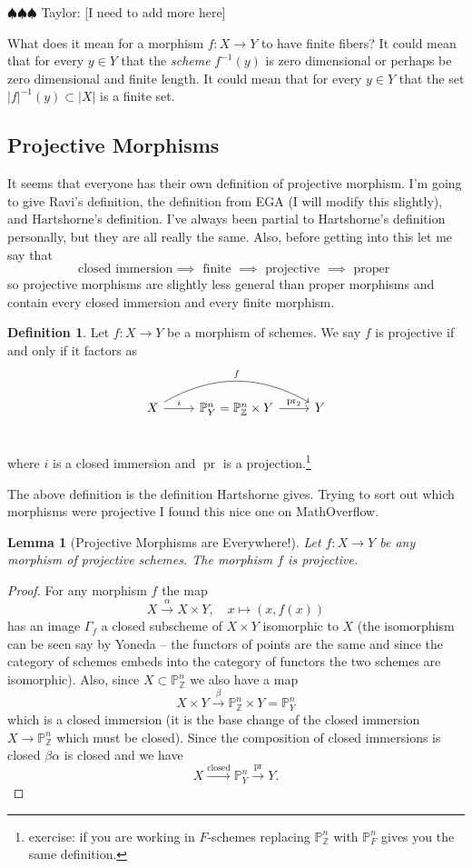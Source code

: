 \documentclass[12pt]{article}
\numberwithin{equation}{section}
\newtheorem{lemma}[theorem]{Lemma}
\theoremstyle{definition}
\newtheorem{definition}[theorem]{Definition}
\theoremstyle{remark}
\newcommand{\ZZ}{\mathbb{Z}}
\newcommand{\PP}{\mathbb{P}}
\newcommand{\pr}{\operatorname{pr}}
\newcommand{\taylor}[1]{{\color{blue} \sf $\spadesuit\spadesuit\spadesuit$ Taylor: [#1]}}
\begin{document}
\taylor{I need to add more here}

What does it mean for a morphism $f:X\to Y$ to have finite fibers?
It could mean that for every $y\in Y$ that the \emph{scheme} $f^{-1}(y)$ is zero dimensional or perhaps be zero dimensional and finite length.
It could mean that for every $y \in Y$ that the set $\vert f\vert^{-1}(y) \subset \vert X \vert$ is a finite set.

\subsection{Projective Morphisms}

It seems that everyone has their own definition of projective morphism.
I'm going to give Ravi's definition, the definition from EGA (I will modify this slightly), and Hartshorne's definition. 
I've always been partial to Hartshorne's definition personally, but they are all really the same.
Also, before getting into this let me say that 
 $$ \mbox{closed immersion} \implies \mbox{ finite } \implies \mbox{ projective } \implies \mbox{ proper } $$
so projective morphisms are slightly less general than proper morphisms and contain every closed immersion and every finite morphism.

\begin{definition}
Let $f:X\to Y$ be a morphism of schemes. We say $f$ is projective if and only if it factors as
	 $$ \begin{tikzcd}
	 X \ar[r,"i"] \ar[rr,bend left, "f"] & \PP^n_Y = \PP^n_{\ZZ}\times Y \ar[r, "\pr_2"] & Y \\
	\end{tikzcd}
	$$
	where $i$ is a closed immersion and $\pr$ is a projection.\footnote{ exercise: if you are working in $F$-schemes replacing $\PP^n_{\ZZ}$ with $\PP^n_F$ gives you the same definition.}
\end{definition}
The above definition is the definition Hartshorne gives. 
Trying to sort out which morphisms were projective I found this nice one on MathOverflow. 
\begin{lemma}[Projective Morphisms are Everywhere!]
	Let $f:X\to Y$ be any morphism of projective schemes.
	The morphism $f$ is projective.
\end{lemma}
\begin{proof}
	For any morphism $f$ the map 
	$$ X \xrightarrow{\alpha} X\times Y, \quad x\mapsto (x,f(x)) $$ 
	has an image $\Gamma_f$ a closed subscheme of $X\times Y$ isomorphic to $X$ (the isomorphism can be seen say by Yoneda -- the functors of points are the same and since the category of schemes embeds into the category of functors the two schemes are isomorphic).
	Also, since $X\subset \PP^n_{\ZZ}$ we also have a map 
	$$ X\times Y \xrightarrow{\beta} \PP^n_{\ZZ}\times Y = \PP^n_Y $$
	which is a closed immersion (it is the base change of the closed immersion $X\to \PP^n_{\ZZ}$ which must be closed).
	Since the composition of closed immersions is closed $\beta \alpha$ is closed and we have 
	$$ X \xrightarrow{\mbox{closed}} \PP^n_Y \xrightarrow{\pr} Y. $$
\end{proof}
\end{document}
